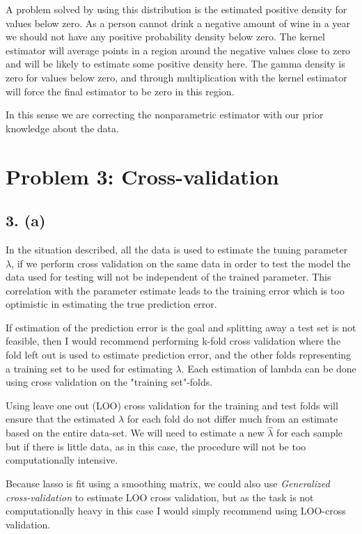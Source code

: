 \documentclass[a4paper, 10pt, english]{article}
\begin{document}
A problem solved by using this distribution is the estimated positive density for values below zero. As a
person cannot drink a negative amount of wine in a year we should not have any positive probability density
below zero. The kernel estimator will average points in a region around the negative values close to zero and
will be likely to estimate some positive density here. The gamma density is zero for values below zero, and
through multiplication with the kernel estimator will force the final estimator to be zero in this region.

In this sense we are correcting the nonparametric estimator with our prior knowledge about the data.


\section{Problem 3: Cross-validation}

\subsection{3. (a)}
In the situation described, all the data is used to estimate the tuning parameter $\lambda$, if we perform
cross validation on the same data in order to test the model the data used for testing will not be independent
of the trained parameter. This correlation with the parameter estimate leads to the training error which is 
too optimistic in estimating the true prediction error.

If estimation of the prediction error is the goal and splitting away a test set is not feasible, then I would
recommend performing k-fold cross validation where the fold left
out is used to estimate prediction error, and the other folds representing a training set to be used for
estimating $\lambda$. Each estimation of lambda can be done using cross validation on the "training
set"-folds.

Using leave one out (LOO) cross validation for the training and test folds will ensure that the estimated $\lambda$
for each fold do not differ much from an estimate based on the entire data-set.
We will need to estimate a new $ \hat{\lambda}$ for each sample but if there is little data, as in this case, the
procedure will not be too computationally intensive.

Because lasso is fit using a smoothing matrix, we could also use \emph{Generalized cross-validation} to
estimate LOO cross validation, but as the task is not computationally heavy in this case I would simply
recommend using LOO-cross validation.
\end{document}
